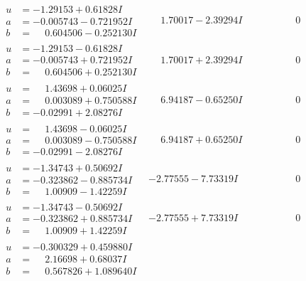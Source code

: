 \documentclass[1p]{elsarticle_modified}
\theoremstyle{definition}
\begin{document}
$$\begin{array}{c|c|c}
\begin{aligned}
u &= -1.29153 + 0.61828 I \\
a &= -0.005743 - 0.721952 I \\
b &= \phantom{-}0.604506 - 0.252130 I\end{aligned}
 & \phantom{-}1.70017 - 2.39294 I & \phantom{-0.000000 } 0 \\ \hline\begin{aligned}
u &= -1.29153 - 0.61828 I \\
a &= -0.005743 + 0.721952 I \\
b &= \phantom{-}0.604506 + 0.252130 I\end{aligned}
 & \phantom{-}1.70017 + 2.39294 I & \phantom{-0.000000 } 0 \\ \hline\begin{aligned}
u &= \phantom{-}1.43698 + 0.06025 I \\
a &= \phantom{-}0.003089 + 0.750588 I \\
b &= -0.02991 + 2.08276 I\end{aligned}
 & \phantom{-}6.94187 - 0.65250 I & \phantom{-0.000000 } 0 \\ \hline\begin{aligned}
u &= \phantom{-}1.43698 - 0.06025 I \\
a &= \phantom{-}0.003089 - 0.750588 I \\
b &= -0.02991 - 2.08276 I\end{aligned}
 & \phantom{-}6.94187 + 0.65250 I & \phantom{-0.000000 } 0 \\ \hline\begin{aligned}
u &= -1.34743 + 0.50692 I \\
a &= -0.323862 - 0.885734 I \\
b &= \phantom{-}1.00909 - 1.42259 I\end{aligned}
 & -2.77555 - 7.73319 I & \phantom{-0.000000 } 0 \\ \hline\begin{aligned}
u &= -1.34743 - 0.50692 I \\
a &= -0.323862 + 0.885734 I \\
b &= \phantom{-}1.00909 + 1.42259 I\end{aligned}
 & -2.77555 + 7.73319 I & \phantom{-0.000000 } 0 \\ \hline\begin{aligned}
u &= -0.300329 + 0.459880 I \\
a &= \phantom{-}2.16698 + 0.68037 I \\
b &= \phantom{-}0.567826 + 1.089640 I\end{aligned}

\end{array}$$
\end{document}
